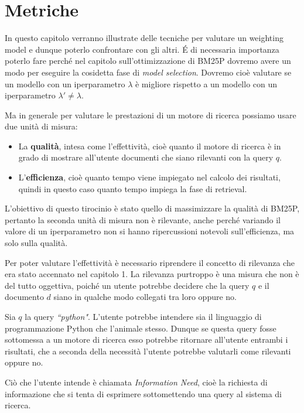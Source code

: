 \chapter{Metriche}

In questo capitolo verranno illustrate delle tecniche per valutare un weighting model e dunque poterlo confrontare con gli altri.
\'E di necessaria importanza poterlo fare perché nel capitolo sull'ottimizzazione di BM25P dovremo avere un modo per eseguire
la cosidetta fase di \textit{model selection}. Dovremo cioè valutare se un modello con un iperparametro $\lambda$ è
migliore rispetto a un modello con un iperparametro $\lambda' \neq \lambda$.

Ma in generale per valutare le prestazioni di un motore di ricerca possiamo usare due unità di misura:

\begin{itemize}
	\item La \textbf{qualità}, intesa come l'effettività, cioè quanto il motore di ricerca
	è in grado di mostrare all'utente documenti che siano rilevanti con la query $q$.
	\item L'\textbf{efficienza}, cioè quanto tempo viene impiegato nel calcolo dei risultati, quindi in questo caso
	quanto tempo impiega la fase di retrieval.
\end{itemize}

L'obiettivo di questo tirocinio è stato quello di massimizzare la qualità di BM25P, pertanto
la seconda unità di misura non è rilevante, anche perché variando il valore di un iperparametro
non si hanno ripercussioni notevoli sull'efficienza, ma solo sulla qualità.

Per poter valutare l'effettività è necessario riprendere il concetto di rilevanza  che era stato
accennato nel capitolo 1. La rilevanza purtroppo è una misura che non è del tutto oggettiva,
poiché un utente potrebbe decidere che la query $q$ e il documento $d$ siano
in qualche modo collegati tra loro oppure no.

\begin{esempio}
	Sia $q$ la query \textit{``python"}. L'utente potrebbe intendere sia il linguaggio di programmazione Python
	che l'animale stesso. Dunque se questa query fosse sottomessa a un motore di ricerca
	esso potrebbe ritornare all'utente entrambi i risultati, che a seconda della necessità
	l'utente potrebbe valutarli come rilevanti oppure no.
\end{esempio}

Ciò che l'utente intende è chiamata \textit{Information Need}, cioè la richiesta di informazione
che si tenta di esprimere sottomettendo una query al sistema di ricerca.


